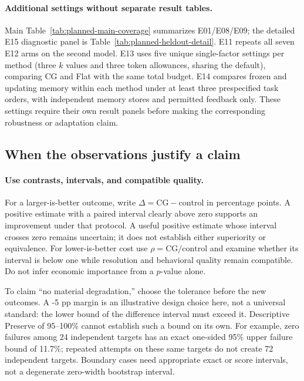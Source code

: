 \paragraph{Additional settings without separate result tables.}
Main Table~\ref{tab:planned-main-coverage} summarizes E01/E08/E09; the detailed
E15 diagnostic panel is Table~\ref{tab:planned-heldout-detail}.
E11 repeats all seven E12 arms on the second model. E13 uses five unique
single-factor settings per method (three $k$ values and three token allowances,
sharing the default), comparing CG and Flat with the same total budget.
E14 compares frozen and updating memory within each method under at least
three prespecified task orders, with independent memory stores and permitted
feedback only. These settings require their own result panels before making
the corresponding robustness or adaptation claim.

\clearpage
\subsection{When the observations justify a claim}
\paragraph{Use contrasts, intervals, and compatible quality.}
For a larger-is-better outcome, write $\Delta=\mathrm{CG}-\mathrm{control}$ in
percentage points. A positive estimate with a paired interval clearly above
zero supports an improvement under that protocol. A useful positive estimate
whose interval crosses zero remains uncertain; it does not establish either
superiority or equivalence. For lower-is-better cost use
$\rho=\mathrm{CG}/\mathrm{control}$ and examine whether its interval is below
one while resolution and behavioral quality remain compatible.
Do not infer economic importance from a $p$-value alone.

To claim ``no material degradation,'' choose the tolerance before the new
outcomes. A -5 pp margin is an illustrative design choice here, not a universal
standard: the lower bound of the difference interval must exceed it.
Descriptive Preserve of 95--100\% cannot establish such a bound on its own.
For example, zero failures among 24 independent targets has an exact one-sided
95\% upper failure bound of 11.7\%; repeated attempts on these same targets do
not create 72 independent targets. Boundary cases need appropriate exact or
score intervals, not a degenerate zero-width bootstrap interval.

